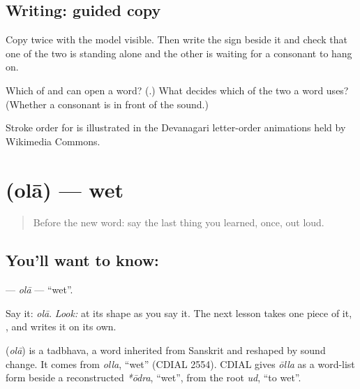 \subsection*{Writing: guided copy}

Copy \textbf{} twice with the model visible. Then write the \textbf{} sign beside it and check that one of the two is standing alone and the other is waiting for a consonant to hang on.

\begin{tcolorbox}[breakable,colback=teal!4,colframe=teal!35!black,title={Before you move on}]
Which of \textbf{} and \textbf{} can open a word? (\textbf{}.) What decides which of the two a word uses? (Whether a consonant is in front of the sound.)

Stroke order for \textbf{} is illustrated in the Devanagari letter-order animations held by Wikimedia Commons.
\end{tcolorbox}
\section[\texorpdfstring{\mr{ओला} (olā)}{ओला (olā)}]{ (olā) — wet}

\label{lesson:MR-C65-ola}



\begin{quote}
Before the new word: say the last thing you learned, once, out loud.
\end{quote}

\subsection*{You'll want to know: }
\textbf{} — \emph{olā} — \textquotedblleft{}wet\textquotedblright{}.

Say it: \emph{olā}. \emph{Look:} at its shape as you say it. The next lesson takes one piece of it, \textbf{}, and writes it on its own.

\begin{cousinweb}
\textbf{} (\emph{olā}) is a tadbhava, a word inherited from Sanskrit and reshaped by sound change. It comes from \emph{olla}, \textquotedblleft{}wet\textquotedblright{} (CDIAL 2554). CDIAL gives \emph{ōlla} as a word-list form beside a reconstructed \emph{*ōdra}, \textquotedblleft{}wet\textquotedblright{}, from the root \emph{ud}, \textquotedblleft{}to wet\textquotedblright{}.
\end{cousinweb}

